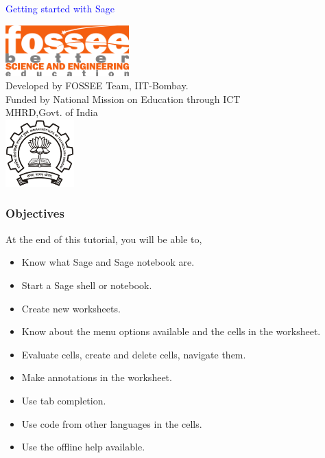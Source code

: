 \documentclass[presentation]{beamer}
\title{}
\author{FOSSEE}
\date{}
\begin{document}
\begin{frame}

\begin{center}
\vspace{12pt}
\textcolor{blue}{\huge Getting started with Sage}
\end{center}
\vspace{18pt}
\begin{center}
\vspace{10pt}
\includegraphics[scale=0.95]{../images/fossee-logo.png}\\
\vspace{5pt}
\scriptsize Developed by FOSSEE Team, IIT-Bombay. \\ 
\scriptsize Funded by National Mission on Education through ICT\\
\scriptsize  MHRD,Govt. of India\\
\includegraphics[scale=0.30]{../images/iitb-logo.png}\\
\end{center}
\end{frame}
\begin{frame}
\frametitle{Objectives}
\label{sec-2}

  At the end of this tutorial, you will be able to,


\begin{itemize}
\item Know what Sage and Sage notebook are.
\item Start a Sage shell or notebook.
\item Create new worksheets.
\item Know about the menu options available and the cells in the worksheet.
\item Evaluate cells, create and delete cells, navigate them.
\item Make annotations in the worksheet.
\item Use tab completion.
\item Use code from other languages in the cells.
\item Use the offline help available.
\end{itemize}
\end{frame}
\end{document}
